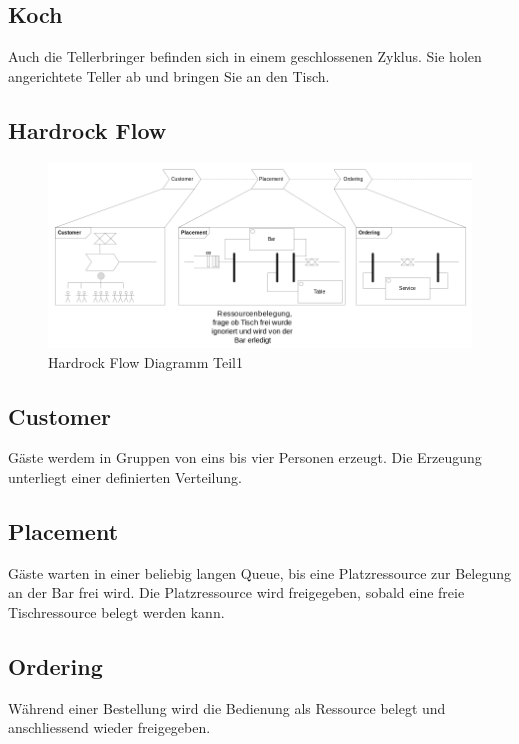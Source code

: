 \documentclass[ngerman,a4paper,12pt]{scrreprt}
\begin{document}
		\subsection{Koch}
		Auch die Tellerbringer befinden sich in einem geschlossenen Zyklus. Sie holen angerichtete Teller ab und bringen Sie an den Tisch.
		

\begin{landscape}
	\section{Hardrock Flow}
		\begin{figure}[H]
			\centering
				\includegraphics[width=1.4\textwidth]{img/flowDiagramm1-v1.png}
				\caption[Hardrock Flow Diagramm Teil1]{Hardrock Flow Diagramm Teil1}
				\label{flowDiagramm1}
		\end{figure}
		
		\subsection{Customer}
		Gäste werdem in Gruppen von eins bis vier Personen erzeugt. Die Erzeugung unterliegt einer definierten Verteilung.
		
		\subsection{Placement}
		Gäste warten in einer beliebig langen Queue, bis eine Platzressource zur Belegung an der Bar frei wird. Die Platzressource wird freigegeben, sobald eine freie Tischressource belegt werden kann.
		
		\subsection{Ordering}
		Während einer Bestellung wird die Bedienung als Ressource belegt und anschliessend wieder freigegeben.
		

\end{landscape}
\end{document}
